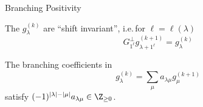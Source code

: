 \documentclass{beamer}
\DeclareMathOperator{\Gr}{Gr}
\begin{document}
\begin{frame}{Branching Positivity}
  \begin{theorem}
    \pause
    The \(g_\lambda^{(k)}\) are ``shift
        invariant'', i.e.\,for \(\ell = \ell(\lambda)\)
      \[
        G_{1^\ell}^\perp g_{\lambda+1^\ell}^{(k+1)} = g_\lambda^{(k)}
      \]
  \end{theorem}\pause
  \begin{theorem}
    The branching coefficients in 
    \[
      g_\lambda^{(k)} = \sum_\mu a_{\lambda \mu} g_\mu^{(k+1)}
    \]
    satisfy \((-1)^{|\lambda|-|\mu|}a_{\lambda \mu} \in \Z_{\geq 0}\).
  \end{theorem}
\end{frame}
\end{document}
